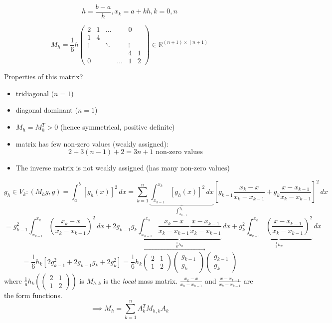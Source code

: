 \documentclass{article}
\begin{document}
\[ h = \frac{b-a}{h}, x_k = a + kh, k = 0,n \]

\[
   M_h =
   \frac16h \begin{pmatrix}
    2 & 1    & \ldots &        & 0 \\
    1 & 4    &        &        & \\
    \vdots & & \ddots &        & \vdots \\
      &      &        &        & 4 & 1 \\
    0 &      &        & \ldots & 1 & 2
  \end{pmatrix}
  \in \mathbb R^{(n+1) \times (n+1)}
\]

Properties of this matrix?
\begin{itemize}
  \item tridiagonal ($n=1$)
  \item diagonal dominant ($n=1$)
  \item $M_h = M_h^T > 0$ (hence symmetrical, positive definite)
  \item matrix has few non-zero values (weakly assigned):  %
     \[ 2 + 3 (n - 1) + 2 = 3n + 1 \text{ non-zero values} \]
  \item The inverse matrix is not weakly assigned (has many non-zero values)
\end{itemize}

\[
  g_h \in V_k: (M_h g, g)
    = \int_a^b [g_h(x)]^2 \, dx
    = \sum_{k=1}^n \underbrace{\int_{x_{k-1}}^{x_k} \left[g_h(x)\right]^2 \, dx}_{\int_{x_{k-1}}^{x_k}} \left[g_{k-1} \frac{x_k - x}{x_k - x_{k-1}} + g_k\frac{x - x_{k-1}}{x_k - x_{k-1}}\right]^2 \, dx \]
\[ = g^2_{k-1} \int_{x_{k-1}}^{x_k} \left(\frac{x_k - x}{x_k - x_{k-1}}\right)^2 \, dx + 2 g_{k-1} g_k \underbrace{\int_{x_{k-1}}^{x_k} \frac{x_k - x}{x_k - x_{k-1}} \frac{x - x_{k-1}}{x_k - x_{k-1}}}_{\frac16 h_k} \, dx + g^2_k \underbrace{\int_{x_{k-1}}^{x_k} \left(\frac{x - x_{k-1}}{x_k - x_{k-1}}\right)^2}_{\frac13 h_k} \, dx \]
\[ = \frac16 h_k \left[2 g_{k-1}^2 + 2 g_{k-1} g_k + 2 g_k^2 \right] = \frac16 h_k \vec{\begin{pmatrix} 2 & 1 \\ 1 & 2 \end{pmatrix}\begin{pmatrix} g_{k-1} \\ g_k \end{pmatrix}}{\begin{pmatrix} g_{k-1} \\ g_k \end{pmatrix}} \]
where $\frac16 h_k \left(\begin{pmatrix} 2 & 1 \\ 1 & 2 \end{pmatrix}\right)$ is $M_{h,k}$ is the \emph{local} mass matrix. %
$\frac{x_k - x}{x_k - x_{k-1}}$ and $\frac{x - x_{k-1}}{x_k - x_{k-1}}$ are the form functions.
\[ \implies M_h = \sum_{k=1}^n A_k^T M_{h,k} A_k \]
\end{document}
